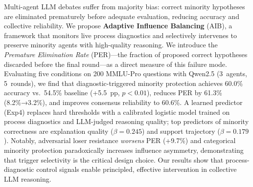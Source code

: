 Multi-agent LLM debates suffer from majority bias: correct minority
hypotheses are eliminated prematurely before adequate evaluation, reducing
accuracy and collective reliability.
We propose \textbf{Adaptive Influence Balancing} (AIB), a framework that
monitors live process diagnostics and selectively intervenes to preserve
minority agents with high-quality reasoning.
We introduce the \emph{Premature Elimination Rate} (PER)—the fraction of
proposed correct hypotheses discarded before the final round—as a direct
measure of this failure mode.
Evaluating five conditions on 200 MMLU-Pro questions with Qwen2.5
(3~agents, 5~rounds), we find that diagnostic-triggered minority protection
achieves 60.0\% accuracy vs.\ 54.5\% baseline (+5.5~pp, $p\!<\!0.01$),
reduces PER by 61.3\% (8.2\%→3.2\%), and improves consensus reliability
to 60.6\%.
A learned predictor (Exp4) replaces hard thresholds with a calibrated
logistic model trained on process diagnostics and LLM-judged reasoning
quality; top predictors of minority correctness are explanation quality
($\beta\!=\!0.245$) and support trajectory ($\beta\!=\!0.179$).
Notably, adversarial loser resistance \emph{worsens} PER (+9.7\%) and
categorical minority protection paradoxically increases influence asymmetry,
demonstrating that trigger selectivity is the critical design choice.
Our results show that process-diagnostic control signals enable principled,
effective intervention in collective LLM reasoning.
